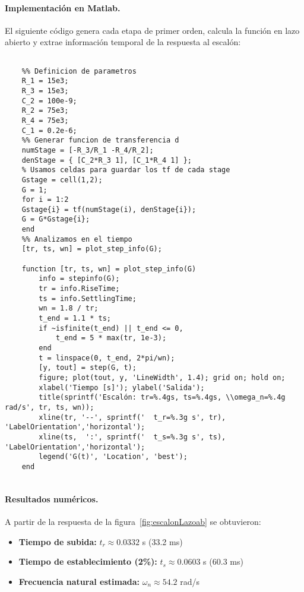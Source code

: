 \paragraph{Implementación en Matlab.}  
El siguiente código genera cada etapa de primer orden, calcula la función en lazo abierto y extrae información temporal de la respuesta al escalón:



\begin{strip}
\vspace{-\baselineskip} %
\noindent
\begin{minipage}{0.98\textwidth}
\begin{lstlisting}[style=matlabstyle,caption={Script en Matlab},label={lst:mat}]
	
	%% Definicion de parametros
	R_1 = 15e3;
	R_3 = 15e3;
	C_2 = 100e-9;
	R_2 = 75e3;
	R_4 = 75e3;
	C_1 = 0.2e-6;
	%% Generar funcion de transferencia d
	numStage = [-R_3/R_1 -R_4/R_2];
	denStage = { [C_2*R_3 1], [C_1*R_4 1] };
	% Usamos celdas para guardar los tf de cada stage
	Gstage = cell(1,2);
	G = 1;
	for i = 1:2
	Gstage{i} = tf(numStage(i), denStage{i});
	G = G*Gstage{i};
	end
	%% Analizamos en el tiempo
	[tr, ts, wn] = plot_step_info(G);
	
	function [tr, ts, wn] = plot_step_info(G)
		info = stepinfo(G);
		tr = info.RiseTime;
		ts = info.SettlingTime;
		wn = 1.8 / tr;
		t_end = 1.1 * ts;
		if ~isfinite(t_end) || t_end <= 0, 
			t_end = 5 * max(tr, 1e-3); 
		end
		t = linspace(0, t_end, 2*pi/wn);
		[y, tout] = step(G, t);
		figure; plot(tout, y, 'LineWidth', 1.4); grid on; hold on;
		xlabel('Tiempo [s]'); ylabel('Salida');
		title(sprintf('Escalón: tr=%.4gs, ts=%.4gs, \\omega_n=%.4g rad/s', tr, ts, wn));
		xline(tr, '--', sprintf('  t_r=%.3g s', tr), 'LabelOrientation','horizontal');
		xline(ts,  ':', sprintf('  t_s=%.3g s', ts), 'LabelOrientation','horizontal');
		legend('G(t)', 'Location', 'best');
	end
	
\end{lstlisting}
\end{minipage}
\vspace{-\baselineskip} %
\end{strip}


\paragraph{Resultados numéricos.}  
A partir de la respuesta de la figura~\ref{fig:escalonLazoab} se obtuvieron:
\begin{itemize}
	\item \textbf{Tiempo de subida:} $t_r \approx 0.0332$ s (33.2 ms)
	\item \textbf{Tiempo de establecimiento (2\%):} $t_s \approx 0.0603$ s (60.3 ms)
	\item \textbf{Frecuencia natural estimada:} $\omega_n \approx 54.2$ rad/s
\end{itemize}




